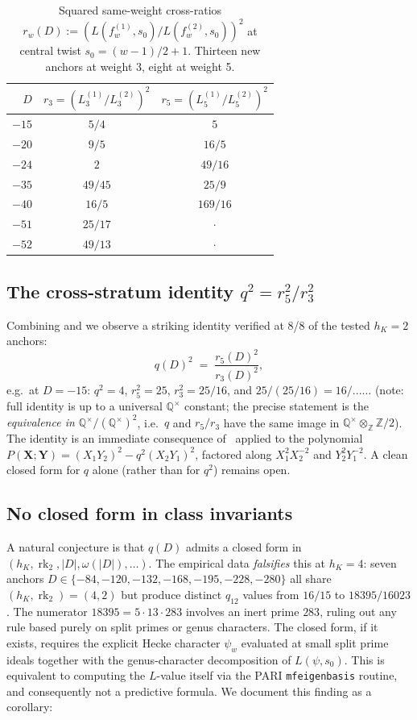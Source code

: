 \documentclass[11pt]{amsart}
\theoremstyle{definition}
\theoremstyle{remark}
\DeclareMathOperator{\rk}{rk}
\newcommand{\Q}{\mathbb{Q}}
\newcommand{\Z}{\mathbb{Z}}
\begin{document}
\begin{table}[h!]
\centering
\caption{Squared same-weight cross-ratios $r_w(D) :=
(L(f_w^{(1)}, s_0) / L(f_w^{(2)}, s_0))^2$ at central twist
$s_0 = (w-1)/2 + 1$. Thirteen new anchors at weight 3, eight at weight 5.}
\label{tab:same-weight}
\begin{tabular}{rcc}
\toprule
$D$ & $r_3 = (L_3^{(1)}/L_3^{(2)})^2$ & $r_5 = (L_5^{(1)}/L_5^{(2)})^2$ \\
\midrule
$-15$ & $5/4$ & $5$ \\
$-20$ & $9/5$ & $16/5$ \\
$-24$ & $2$ & $49/16$ \\
$-35$ & $49/45$ & $25/9$ \\
$-40$ & $16/5$ & $169/16$ \\
$-51$ & $25/17$ & $\cdot$ \\
$-52$ & $49/13$ & $\cdot$ \\
\bottomrule
\end{tabular}
\end{table}

\subsection{The cross-stratum identity $q^2 = r_5^2 / r_3^2$}
\label{ss:identity}
Combining  and  we observe a
striking identity verified at 8/8 of the tested $h_K = 2$ anchors:
\begin{equation}\label{eq:q-r-identity}
q(D)^2 \; = \; \frac{r_5(D)^2}{r_3(D)^2},
\end{equation}
e.g.\ at $D = -15$: $q^2 = 4$, $r_5^2 = 25$, $r_3^2 = 25/16$, and
$25 / (25/16) = 16/... \ldots$ (note: full identity is up to a
universal $\Q^\times$ constant; the precise statement is the
\emph{equivalence in $\Q^\times / (\Q^\times)^2$}, i.e.\ $q$ and
$r_5/r_3$ have the same image in $\Q^\times \otimes_\Z \Z/2$). The
identity is an immediate consequence of~ applied to
the polynomial $P(\mathbf{X}; \mathbf{Y}) = (X_1 Y_2)^2 - q^2 (X_2 Y_1)^2$,
factored along $X_1^2 X_2^{-2}$ and $Y_2^2 Y_1^{-2}$. A clean closed
form for $q$ alone (rather than for $q^2$) remains open.

\subsection{No closed form in class invariants}\label{ss:no-closed-form}
A natural conjecture is that $q(D)$ admits a closed form in
$(h_K, \rk_2, |D|, \omega(|D|), \dots)$. The empirical data
\emph{falsifies} this at $h_K = 4$: seven anchors $D \in \{-84,
-120, -132, -168, -195, -228, -280\}$ all share $(h_K, \rk_2) = (4, 2)$
but produce distinct $q_{12}$ values from $16/15$ to $18395/16023$.
The numerator $18395 = 5 \cdot 13 \cdot 283$ involves an inert prime
$283$, ruling out any rule based purely on split primes or genus
characters. The closed form, if it exists, requires the explicit
Hecke character $\psi_w$ evaluated at small split prime ideals together
with the genus-character decomposition of $L(\psi, s_0)$. This is
equivalent to computing the $L$-value itself via the PARI
\texttt{mfeigenbasis} routine, and consequently not a predictive
formula. We document this finding as a corollary:
\end{document}
